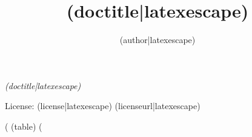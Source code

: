 \documentclass[10pt,twoside,openright]{memoir}
\author{({author|latexescape})}
\title{({doctitle|latexescape})}
\date{}
\makeatletter
\def\maketitle{%
  \null
  \thispagestyle{empty}%
  \vfill
  \begin{center}\leavevmode
    \normalfont
    {\LARGE\raggedleft \@author\par}%
    \hrulefill\par
    {\huge\raggedright \@title\par}%
    \vskip 1cm
  \end{center}%
  \vfill
  \null
  \cleardoublepage
  }
\makeatother
\begin{document}
\let\cleardoublepage\clearpage


\maketitle






\frontmatter

\null\vfill

\begin{flushleft}
\textit{({doctitle|latexescape})}








\bigskip





License: ({license|latexescape})
({licenseurl|latexescape})



\end{flushleft}
\let\cleardoublepage\clearpage

\mainmatter
\sloppy
\noindent
{}
\def\arraystretch{1.5}
\footnotesize

(%
  ({table})
(%
\end{document}
